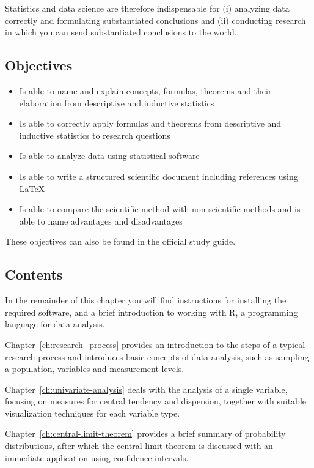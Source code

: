 Statistics and data science are therefore indispensable for (i) analyzing data correctly and formulating substantiated conclusions and (ii) conducting research in which you can send substantiated conclusions to the world.

\subsection{Objectives}

\begin{itemize}
    \item Is able to name and explain concepts, formulas, theorems  and their elaboration from descriptive and inductive statistics
    \item Is able to correctly apply formulas and theorems from descriptive and inductive statistics to research questions
    \item Is able to analyze data using statistical software
    \item Is able to write a structured scientific document including references using \LaTeX{}
    \item Is able to compare the scientific method with non-scientific methods and is able to name advantages and disadvantages
\end{itemize}

These objectives can also be found in the official study guide.

\subsection{Contents}

In the remainder of this chapter you will find instructions for installing the required software, and a brief introduction to working with R, a programming language for data analysis.

Chapter~\ref{ch:research_process} provides an introduction to the steps of a typical research process and introduces basic concepts of data analysis, such as sampling a population, variables and measurement levels.

Chapter~\ref{ch:univariate-analysis} deals with the analysis of a single variable, focusing on measures for central tendency and dispersion, together with suitable visualization techniques for each variable type.

Chapter~\ref {ch:central-limit-theorem} provides a brief summary of probability distributions, after which the central limit theorem is discussed with an immediate application using confidence intervals.

